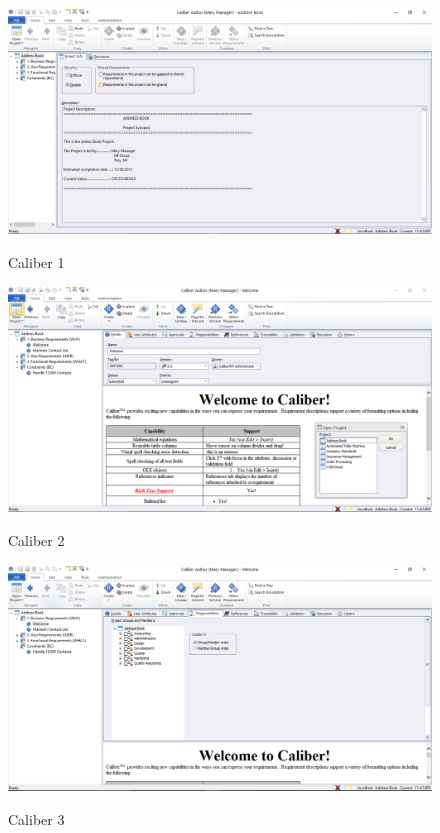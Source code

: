 \FloatBarrier
\begin{figure}[!htpd]
		\centering
		\includegraphics[scale=0.4]{figuras/caliber_1}
		\label{img:SAF}
		\caption{Caliber 1}
\end{figure}
\FloatBarrier

\FloatBarrier
\begin{figure}[!htpd]
		\centering
		\includegraphics[scale=0.5]{figuras/caliber_2}
		\label{img:SAF}
		\caption{Caliber 2}
\end{figure}
\FloatBarrier

\FloatBarrier
\begin{figure}[!htpd]
		\centering
		\includegraphics[scale=0.4]{figuras/caliber_3}
		\label{img:SAF}
		\caption{Caliber 3}
\end{figure}
\FloatBarrier



